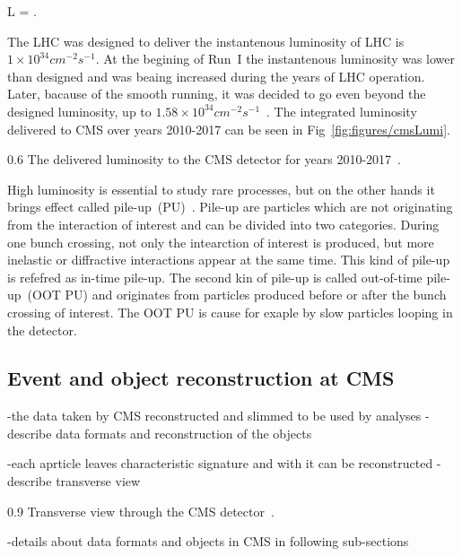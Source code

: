 {
 L = .
}

The LHC was designed to deliver the instantenous luminosity of LHC is $1 \times 10^{34} cm^{-2}s^{-1}$. At the begining of Run~I the instantenous luminosity was lower than designed and was beaing increased during the years of LHC operation. Later, bacause of the smooth running, it was decided to go even beyond the designed luminosity, up to $1.58 \times 10^{34} cm^{-2}s^{-1}$~\cite{Pralavorio:2272474}. The integrated luminosity delivered to CMS over years 2010-2017 can be seen in Fig~\ref{fig:figures/cmsLumi}.

                 {0.6}       %
                 { The delivered luminosity to the CMS detector for years 2010-2017~\cite{website:CMSlumi}. }


High luminosity is essential to study rare processes, but on the other hands it brings effect called pile-up~(PU)~\cite{Bayatian:2006nff}. Pile-up are particles which are not originating from the interaction of interest and can be divided into two categories. During one bunch crossing, not only the intearction of interest is produced, but more inelastic or diffractive interactions appear at the same time. This kind of pile-up is refefred as in-time pile-up. The second kin of pile-up is called out-of-time pile-up~(OOT PU) and originates from particles produced before or after the bunch crossing of interest. The OOT PU is cause for exaple by slow particles looping in the detector.

\newpage

\subsection{Event and object reconstruction at CMS}

-the data taken by CMS reconstructed and slimmed to be used by analyses
-describe data formats and reconstruction of the objects

-each aprticle leaves characteristic signature and with it can be reconstructed - describe transverse view

                 {0.9}       %
                 { Transverse view through the CMS detector~\cite{Sirunyan:2017ulk}. }

-details about data formats and objects in CMS in following sub-sections

